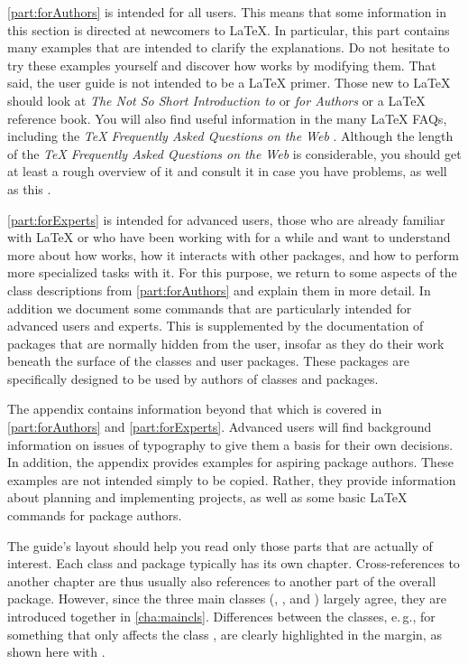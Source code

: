 \autoref{part:forAuthors} is intended for all {\KOMAScript} users. This means
that some information in this section is directed at newcomers to \LaTeX. In
particular, this part contains many examples that are intended to clarify the
explanations. Do not hesitate to try these examples yourself and discover how
{\KOMAScript} works by modifying them. That said, the {\KOMAScript} user guide
is not intended to be a {\LaTeX} primer. Those new to {\LaTeX} should look at
\emph{The Not So Short Introduction to {\LaTeXe}} \cite{lshort} or
\emph{{\LaTeXe} for Authors} \cite{latex:usrguide} or a {\LaTeX} reference
book. You will also find useful information in the many {\LaTeX} FAQs,
including the \emph{{\TeX} Frequently Asked Questions on the Web}
\cite{UK:FAQ}. Although the length of the \emph{{\TeX} Frequently Asked
	Questions on the Web} is considerable, you should get at least a rough
overview of it and consult it in case you have problems, as well as this
.

\autoref{part:forExperts} is intended for advanced {\KOMAScript} users, those
who are already familiar with \LaTeX{} or who have been working with
{\KOMAScript} for a while and want to understand more about how {\KOMAScript}
works, how it interacts with other packages, and how to perform more
specialized tasks with it. For this purpose, we return to some aspects of the
class descriptions from \autoref{part:forAuthors} and explain them in more
detail. In addition we document some commands that are particularly intended
for advanced users and experts. This is supplemented by the documentation of
packages that are normally hidden from the user, insofar as they do their work
beneath the surface of the classes and user packages. These packages are
specifically designed to be used by authors of classes and packages.

The appendix
contains information beyond that which is covered in \autoref{part:forAuthors}
and \autoref{part:forExperts}. Advanced users will find background information
on issues of typography to give them a basis for their own decisions. In
addition, the appendix provides examples for aspiring package authors. These
examples are not intended simply to be copied. Rather, they provide
information about planning and implementing projects, as well as some basic
\LaTeX{} commands for package authors.

The guide's layout should help you read only those parts that are actually of
interest. Each class and package typically has its own chapter.
Cross-references to another chapter are thus usually also references to
another part of the overall package. However, since the three main classes
(, , and ) largely agree, they
are introduced together in \autoref{cha:maincls}. Differences between the
classes, e.\,g., for something that only affects the class
, are clearly highlighted in the
margin, as shown here with .

